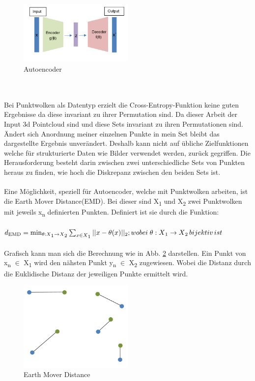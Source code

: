 \documentclass{llncs}
\begin{document}
\begin{figure}[htbp] 
	\centering
	\includegraphics[width=0.5\textwidth]{autoencoder.png}
	\caption{Autoencoder}
	\label{fig:Bild13}
\end{figure}
~\\\\
Bei Punktwolken als Datentyp erzielt die Cross-Entropy-Funktion keine guten Ergebnisse da diese invariant zu ihrer Permutation sind. Da dieser Arbeit der Input 3d Pointcloud sind und diese Sets  invariant zu ihren Permutationen sind. Ändert sich Anordnung meiner einzelnen Punkte in mein Set bleibt das dargestellte Ergebnis unverändert.  Deshalb kann nicht auf übliche Zielfunktionen welche für strukturierte Daten wie Bilder verwendet werden, zurück gegriffen. Die Herausforderung besteht darin zwischen zwei unterschiedliche Sets von Punkten heraus zu finden, wie hoch die Diskrepanz zwischen den beiden Sets ist\cite{invariant}. 
\\\\
Eine Möglichkeit, speziell für Autoencoder, welche mit Punktwolken arbeiten, ist die Earth Mover Distance(EMD). Bei dieser sind X\textsubscript{1} und X\textsubscript{2} zwei Punktwolken mit jeweils x\textsubscript{n} definierten Punkten\cite{autoencoderloss}. Definiert ist sie durch die Funktion:
\\\\
\begin{math}
d\textsubscript{EMD}=\min_{\theta : X\textsubscript{1}\rightarrow X\textsubscript{2}}  \sum_{x\in X\textsubscript{1}}|| x - \theta(x)||\textsubscript{2};wobei\;\theta: X\textsubscript{1} \rightarrow X\textsubscript{2}\, bijektiv\, ist 
\end{math}
\\\\
Grafisch kann man sich die Berechnung wie in Abb. \ref{fig:Bild14} darstellen. Ein Punkt von x\textsubscript{n} $\in$ X\textsubscript{1} wird den nähsten Punkt y\textsubscript{n} $\in$  X\textsubscript{2} zugewiesen. Wobei die Distanz durch die Euklidische Distanz der jeweiligen Punkte ermittelt wird.
 
\begin{figure}[htbp] 
	\centering
	\includegraphics[width=0.5\textwidth]{emd_distance.png}
	\caption{Earth Mover Distance}
	\label{fig:Bild14}
\end{figure}
		
\end{document}
